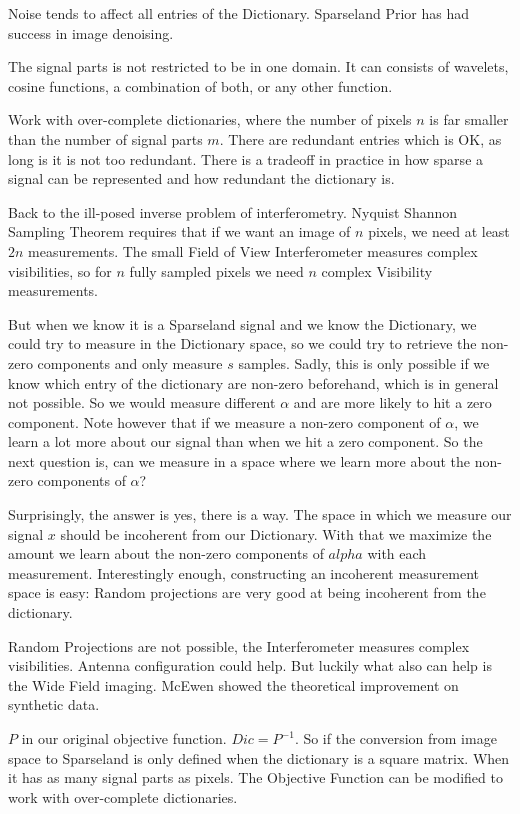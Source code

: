 Noise tends to affect all entries of the Dictionary. Sparseland Prior has had success in image denoising.

The signal parts is not restricted to be in one domain. It can consists of wavelets, cosine functions, a combination of both, or any other function. 

Work with over-complete dictionaries, where the number of pixels $n$ is far smaller than the number of signal parts $m$. There are redundant entries which is OK, as long is it is not too redundant. There is a tradeoff in practice in how sparse a signal can be represented and how redundant the dictionary is.

Back to the ill-posed inverse problem of interferometry. Nyquist Shannon Sampling Theorem requires that if we want an image of $n$ pixels, we need at least $2n$ measurements. The small Field of View Interferometer measures complex visibilities, so for $n$ fully sampled pixels we need $n$ complex Visibility measurements.

But when we know it is a Sparseland signal and we know the Dictionary, we could try to measure in the Dictionary space, so we could try to retrieve the non-zero components and only measure $s$ samples. Sadly, this is only possible if we know which entry of the dictionary are non-zero beforehand, which is in general not possible. So we would measure different $\alpha$ and are more likely to hit a zero component. Note however that if we measure a non-zero component of $\alpha$, we learn a lot more about our signal than when we hit a zero component. So the next question is, can we measure in a space where we learn more about the non-zero components of $\alpha$?

Surprisingly, the answer is yes, there is a way. The space in which we measure our signal $x$ should be incoherent from our Dictionary. With that we maximize the amount we learn about the non-zero components of $alpha$ with each measurement. Interestingly enough, constructing an incoherent measurement space is easy: Random projections are very good at being incoherent from the dictionary. 

Random Projections are not possible, the Interferometer measures complex visibilities. Antenna configuration could help. But luckily what also can help is the Wide Field imaging. McEwen \cite{mcewen2011compressed} showed the theoretical improvement on synthetic data.

$P$ in our original objective function. $Dic = P^{-1}$. So if the conversion from image space to Sparseland is only defined when the dictionary is a square matrix. When it has as many signal parts as pixels. The Objective Function can be modified to work with over-complete dictionaries.


